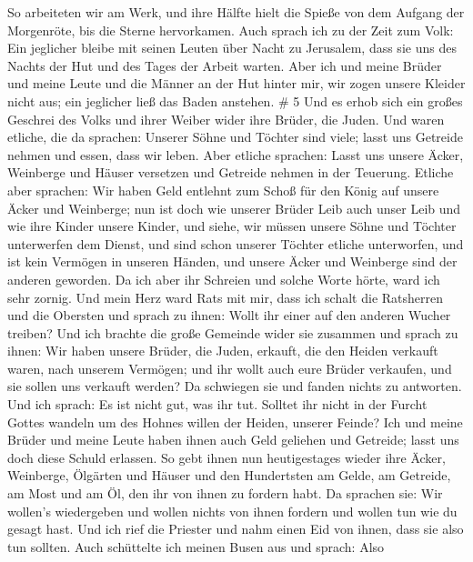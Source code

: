  So arbeiteten wir am Werk, und ihre Hälfte hielt die
Spieße von dem Aufgang der Morgenröte, bis die Sterne hervorkamen.
 Auch sprach ich zu der Zeit zum Volk: Ein jeglicher bleibe
mit seinen Leuten über Nacht zu Jerusalem, dass sie uns des Nachts der
Hut und des Tages der Arbeit warten.  Aber ich und meine
Brüder und meine Leute und die Männer an der Hut hinter mir, wir zogen
unsere Kleider nicht aus; ein jeglicher ließ das Baden anstehen. \# 5
 Und es erhob sich ein großes Geschrei des Volks und ihrer
Weiber wider ihre Brüder, die Juden.  Und waren etliche, die
da sprachen: Unserer Söhne und Töchter sind viele; lasst uns Getreide
nehmen und essen, dass wir leben.  Aber etliche sprachen:
Lasst uns unsere Äcker, Weinberge und Häuser versetzen und Getreide
nehmen in der Teuerung.  Etliche aber sprachen: Wir haben
Geld entlehnt zum Schoß für den König auf unsere Äcker und Weinberge;
 nun ist doch wie unserer Brüder Leib auch unser Leib und
wie ihre Kinder unsere Kinder, und siehe, wir müssen unsere Söhne und
Töchter unterwerfen dem Dienst, und sind schon unserer Töchter etliche
unterworfen, und ist kein Vermögen in unseren Händen, und unsere Äcker
und Weinberge sind der anderen geworden.  Da ich aber ihr
Schreien und solche Worte hörte, ward ich sehr zornig.  Und
mein Herz ward Rats mit mir, dass ich schalt die Ratsherren und die
Obersten und sprach zu ihnen: Wollt ihr einer auf den anderen Wucher
treiben? Und ich brachte die große Gemeinde wider sie zusammen
 und sprach zu ihnen: Wir haben unsere Brüder, die Juden,
erkauft, die den Heiden verkauft waren, nach unserem Vermögen; und ihr
wollt auch eure Brüder verkaufen, und sie sollen uns verkauft werden? Da
schwiegen sie und fanden nichts zu antworten.  Und ich
sprach: Es ist nicht gut, was ihr tut. Solltet ihr nicht in der Furcht
Gottes wandeln um des Hohnes willen der Heiden, unserer Feinde?
 Ich und meine Brüder und meine Leute haben ihnen auch Geld
geliehen und Getreide; lasst uns doch diese Schuld erlassen.
 So gebt ihnen nun heutigestages wieder ihre Äcker,
Weinberge, Ölgärten und Häuser und den Hundertsten am Gelde, am
Getreide, am Most und am Öl, den ihr von ihnen zu fordern habt.
 Da sprachen sie: Wir wollen's wiedergeben und wollen
nichts von ihnen fordern und wollen tun wie du gesagt hast. Und ich rief
die Priester und nahm einen Eid von ihnen, dass sie also tun sollten.
 Auch schüttelte ich meinen Busen aus und sprach: Also
